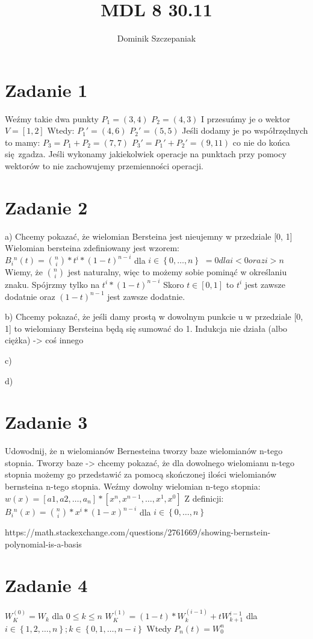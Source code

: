 \documentclass[12pt]{article}
\title{MDL 8 30.11}
\author{Dominik Szczepaniak}
\newcommand{\set}[1]{\left \{ #1 \right \}}				%
\begin{document}
\maketitle
\bgroup\obeylines

\section{Zadanie 1}
Weźmy takie dwa punkty 
$P_1 = (3, 4)$
$P_2 = (4, 3)$
I przesuńmy je o wektor $V = [1, 2]$
Wtedy:
$P_1' = (4, 6)$
$P_2' = (5, 5)$
Jeśli dodamy je po współrzędnych to mamy:
$P_3 = P_1 + P_2 = (7, 7)$
$P_3' = P_1' + P_2' = (9, 11)$ co nie do końca się zgadza. Jeśli wykonamy jakiekolwiek operacje na punktach przy pomocy wektorów to nie zachowujemy przemienności operacji.

\section{Zadanie 2}
a) Chcemy pokazać, że wielomian Bersteina jest nieujemny w przedziale [0, 1]
Wielomian bersteina zdefiniowany jest wzorem:
$B{_{i}}^{n}(t) = \binom{n}{i}*t^i*(1-t)^{n-i}$ dla $i \in \set{0, \dots, n}$
            $= 0 dla i < 0 oraz i > n$
Wiemy, że $\binom{n}{i}$ jest naturalny, więc to możemy sobie pominąć w określaniu znaku.
Spójrzmy tylko na $t^i * (1-t)^{n-i}$
Skoro $t \in [0, 1]$ to $t^i$ jest zawsze dodatnie oraz $(1-t)^{n-1}$ jest zawsze dodatnie. 

b) Chcemy pokazać, że jeśli damy prostą w dowolnym punkcie u w przedziale [0, 1] to wielomiany Bersteina będą się sumować do 1. 
Indukcja nie działa (albo ciężka) -> coś innego 

c) 

d)
\section{Zadanie 3}
Udowodnij, że n wielomianów Bernesteina tworzy baze wielomianów n-tego stopnia.
Tworzy baze -> chcemy pokazać, że dla dowolnego wielomianu n-tego stopnia możemy go przedstawić za pomocą skończonej ilości wielomianów bernsteina n-tego stopnia.
Weźmy dowolny wielomian n-tego stopnia:
$w(x) = [a1, a2, \dots, a_n] * [x^n, x^{n-1}, \dots, x^1, x^0]$
Z definicji:
$B{_{i}}^{n}(x) = \binom{n}{i}*x^i*(1-x)^{n-i}$ dla $i \in \set{0, \dots, n}$


https://math.stackexchange.com/questions/2761669/showing-bernstein-polynomial-is-a-basis
\section{Zadanie 4}
$W_K^{(0)} = W_k$ dla $0 \leq k \leq n$
$W_K^{(1)} = (1-t)*W_k^{(i-1)} + tW_{k+1}^{i-1}$ dla $i \in \set{1, 2, \dots, n}; k \in \set{0, 1, \dots, n-i}$
Wtedy $P_n(t) = W_0^{n}$


\egroup
\end{document}
